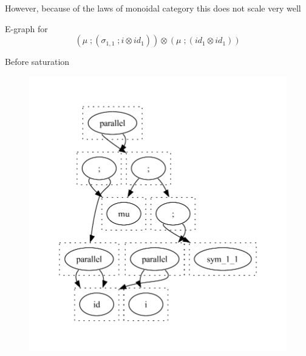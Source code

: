 \documentclass[aspectratio=169]{beamer}
\begin{document}
\begin{frame}
    However, because of the laws of monoidal category this does not scale very well
\end{frame}

\begin{frame}
    \small
    \begin{example}
        \vspace{1em}
        E-graph for
        \[
            (\mu\;;(\sigma_{1,1}\;;i \otimes id_{1})) \otimes (\mu\;;(id_{1}\otimes id_{1}))
        \]

        Before saturation
        \vspace{-3em}
        \begin{figure}
            \includegraphics[scale=0.4]{figures/egraph_before_saturation_fix.pdf}
        \end{figure}
    \end{example}
\end{frame}
\end{document}

